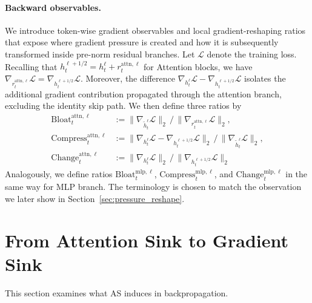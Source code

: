 \documentclass{article}
\theoremstyle{plain}
\theoremstyle{definition}
\theoremstyle{remark}
\begin{document}
\paragraph{Backward observables.}
We introduce token-wise gradient observables and local gradient-reshaping ratios that expose where gradient pressure is created and how it is subsequently transformed inside pre-norm residual branches.
Let $\mathcal{L}$ denote the training loss. Recalling that $h_t^{\ell+{1}/{2}} = h_t^\ell + r_t^{\mathrm{attn},\ell}$ for Attention blocks, we have $\nabla_{r_t^{\mathrm{attn},\ell}}\mathcal{L} = \nabla_{h_t^{\ell+{1}/{2}}}\mathcal{L}$. Moreover, the difference $\nabla_{h_t^\ell}\mathcal{L} - \nabla_{h_t^{\ell+{1}/{2}}}\mathcal{L}$ isolates the additional gradient contribution propagated through the attention branch, excluding the identity skip path.
We then define three ratios by
\begin{equation}\label{eq:ratios_attn}
\begin{aligned}
    \mathrm{Bloat}_t^{\mathrm{attn},\ell}
    &:= \|\nabla_{\widetilde h_t^\ell}\mathcal{L}\|_2 \,/\, \|\nabla_{r_t^{\mathrm{attn},\ell}}\mathcal{L}\|_2, \\
    \mathrm{Compress}_t^{\mathrm{attn},\ell}
    &:= \|\nabla_{h_t^\ell}\mathcal{L} - \nabla_{h_t^{\ell+{1}/{2}}}\mathcal{L}\|_2 \,/\, \|\nabla_{\widetilde h_t^\ell}\mathcal{L}\|_2, \\
    \mathrm{Change}_t^{\mathrm{attn},\ell}
    &:= \|\nabla_{h_t^\ell}\mathcal{L}\|_2 \,/\, \|\nabla_{h_t^{\ell+{1}/{2}}}\mathcal{L}\|_2
\end{aligned}
\end{equation}
Analogously, we define ratios $\mathrm{Bloat}_t^{\mathrm{mlp},\ell}$, $\mathrm{Compress}_t^{\mathrm{mlp},\ell}$, and $\mathrm{Change}_t^{\mathrm{mlp},\ell}$ in the same way for MLP branch.
The terminology is chosen to match the observation we later show in Section~\ref{sec:pressure_reshape}.

\section{From Attention Sink to Gradient Sink}\label{sec:as_to_gs}
This section examines what AS induces in backpropagation. 
\end{document}
